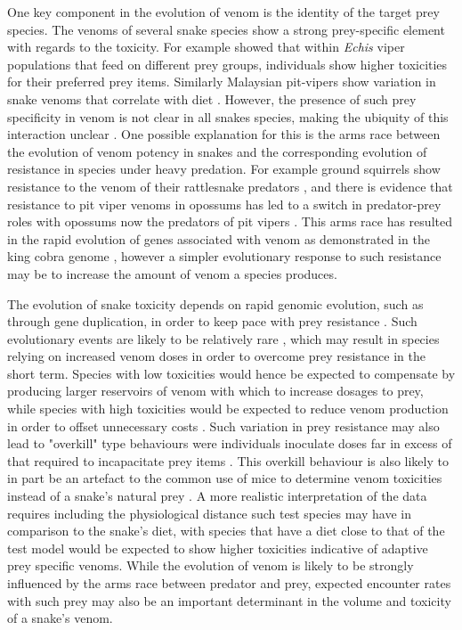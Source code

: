 One key component in the evolution of venom is the identity of the target prey species. The venoms of several snake species show a strong prey-specific element with regards to the toxicity. For example \cite{barlow2009coevolution} showed that within \textit{Echis} viper populations that feed on different prey groups, individuals show higher toxicities for their preferred prey items. Similarly Malaysian pit-vipers show variation in snake venoms that correlate with diet \citep{daltry1996diet}. However, the presence of such prey specificity in venom is not clear in all snakes species, making the ubiquity of this interaction unclear \citep{williams1988variation}. One possible explanation for this is the arms race between the evolution of venom potency in snakes and the corresponding evolution of resistance in species under heavy predation. For example ground squirrels show resistance to the venom of their rattlesnake predators \citep{poran1987resistance}, and there is evidence that resistance to pit viper venoms in opossums has led to a switch in predator-prey roles with opossums now the predators of pit vipers \citep{voss2013opossums}. This arms race has resulted in the rapid evolution of genes associated with venom as demonstrated in the king cobra genome \citep{vonk2013king}, however a simpler evolutionary response to such resistance may be to increase the amount of venom a species produces.


The evolution of snake toxicity depends on rapid genomic evolution, such as through gene duplication, in order to keep pace with prey resistance \citep{vonk2013king}. Such evolutionary events are likely to be relatively rare \citep{vonk2013king}, which may result in species relying on increased venom doses in order to overcome prey resistance in the short term. Species with low toxicities would hence be expected to compensate by producing larger reservoirs of venom with which to increase dosages to prey, while species with high toxicities would be expected to reduce venom production in order to offset unnecessary costs \citep{mccue2006cost}. Such variation in prey resistance may also lead to "overkill" type behaviours were individuals inoculate doses far in excess of that required to incapacitate prey items \citep{sasa1999diet,mebs2001toxicity}. This overkill behaviour is also likely to in part be an artefact to the common use of mice to determine venom toxicities instead of a snake's natural prey \citep{da2001prey}. A more realistic interpretation of the data requires including the physiological distance such test species may have in comparison to the snake's diet, with species that have a diet close to that of the test model would be expected to show higher toxicities indicative of adaptive prey specific venoms. While the evolution of venom is likely to be strongly influenced by the arms race between predator and prey, expected encounter rates with such prey may also be an important determinant in the volume and toxicity of a snake's venom.


